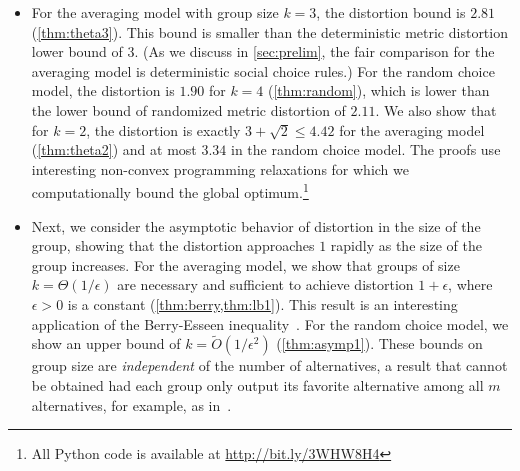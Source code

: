 \begin{itemize}
\item For the averaging model %
with group size $k=3$, the distortion bound is $2.81$ (\cref{thm:theta3}). %
This bound is smaller than the deterministic metric distortion lower bound of $3$. (As we discuss in \cref{sec:prelim}, the fair comparison for the averaging model is deterministic social choice rules.) For the random choice model, the distortion is $1.90$ for $k=4$ (\cref{thm:random}), which is lower than the lower bound of randomized metric distortion of $2.11$. We also show that for $k=2$, the distortion is exactly $3 + \sqrt{2} \le 4.42$ for the averaging model (\cref{thm:theta2}) and at most $3.34$ in the random choice model. The proofs use interesting non-convex programming relaxations for which we computationally bound the global optimum.\footnote{All Python code is available at \url{http://bit.ly/3WHW8H4}}

\item Next, we consider the asymptotic behavior of distortion in the size of the group, showing that the distortion approaches $1$ rapidly as the size of the group increases. For the averaging model, we show that groups of size $k = \Theta(1/\epsilon)$ are necessary and sufficient to achieve distortion $1+\epsilon$, where $\epsilon > 0$ is a constant (\cref{thm:berry,thm:lb1}). This result is an interesting application of the Berry-Esseen inequality~\cite{feller1971introduction}. For the random choice model, we show an upper bound of $k = \tilde{O}(1/\epsilon^2)$ (\cref{thm:asymp1}). These bounds on group size are {\em independent} of the number of alternatives, a result that cannot be obtained had each group only output its favorite alternative among all $m$ alternatives, for example, as in~\cite{CaragiannisM024}. %


\end{itemize}
